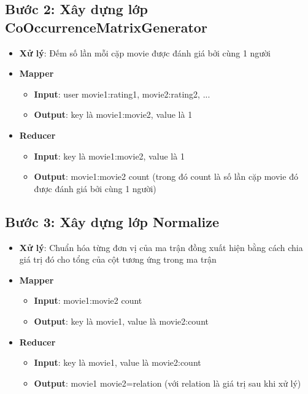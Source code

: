 \subsection*{Bước 2: Xây dựng lớp CoOccurrenceMatrixGenerator}
\begin{itemize}
    \item \textbf{Xử lý}: Đếm số lần mỗi cặp movie được đánh giá bởi cùng 1 người \\
    \item \textbf{Mapper}
          \begin{itemize}
              \item \textbf{Input}: user \quad movie1:rating1, movie2:rating2, ... \\
              \item \textbf{Output}: key là movie1:movie2, value là 1 \\
          \end{itemize}
    \item \textbf{Reducer}
          \begin{itemize}
              \item \textbf{Input}: key là movie1:movie2, value là 1 \\
              \item \textbf{Output}: movie1:movie2 \quad count (trong đó
                    count là số lần cặp movie đó được đánh giá bởi cùng 1 người) \\
          \end{itemize}
\end{itemize}
\subsection*{Bước 3: Xây dựng lớp Normalize}
\begin{itemize}
    \item \textbf{Xử lý}: Chuẩn hóa từng đơn vị của ma trận đồng xuất hiện
          bằng cách chia giá trị đó cho tổng của cột tương ứng trong ma trận
    \item \textbf{Mapper}
          \begin{itemize}
              \item \textbf{Input}: movie1:movie2 \quad count \\
              \item \textbf{Output}: key là movie1, value là movie2:count \\
          \end{itemize}
    \item \textbf{Reducer}
          \begin{itemize}
              \item \textbf{Input}: key là movie1, value là movie2:count \\
              \item \textbf{Output}: movie1 \quad movie2=relation (với relation
                    là giá trị sau khi xử lý) \\
          \end{itemize}
\end{itemize}
